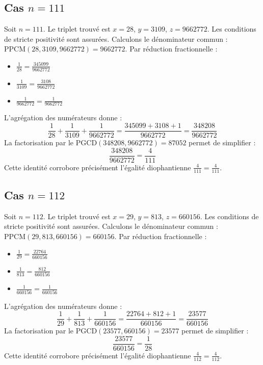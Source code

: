 \documentclass[11pt,a4paper]{article}
\begin{document}
\subsection{Cas $n = 111$}
Soit $n = 111$. Le triplet trouvé est $x = 28$, $y = 3109$, $z = 9662772$.
Les conditions de stricte positivité sont assurées.
Calculons le dénominateur commun : $\text{PPCM}(28, 3109, 9662772) = 9662772$.
Par réduction fractionnelle :
\begin{itemize}
    \item $\frac{1}{28} = \frac{345099}{9662772}$
    \item $\frac{1}{3109} = \frac{3108}{9662772}$
    \item $\frac{1}{9662772} = \frac{1}{9662772}$
\end{itemize}
L'agrégation des numérateurs donne :
$$ \frac{1}{28} + \frac{1}{3109} + \frac{1}{9662772} = \frac{345099 + 3108 + 1}{9662772} = \frac{348208}{9662772} $$
La factorisation par le $\text{PGCD}(348208, 9662772) = 87052$ permet de simplifier :
$$ \frac{348208}{9662772} = \frac{4}{111} $$
Cette identité corrobore précisément l'égalité diophantienne $\frac{4}{111} = \frac{4}{111}$.

\subsection{Cas $n = 112$}
Soit $n = 112$. Le triplet trouvé est $x = 29$, $y = 813$, $z = 660156$.
Les conditions de stricte positivité sont assurées.
Calculons le dénominateur commun : $\text{PPCM}(29, 813, 660156) = 660156$.
Par réduction fractionnelle :
\begin{itemize}
    \item $\frac{1}{29} = \frac{22764}{660156}$
    \item $\frac{1}{813} = \frac{812}{660156}$
    \item $\frac{1}{660156} = \frac{1}{660156}$
\end{itemize}
L'agrégation des numérateurs donne :
$$ \frac{1}{29} + \frac{1}{813} + \frac{1}{660156} = \frac{22764 + 812 + 1}{660156} = \frac{23577}{660156} $$
La factorisation par le $\text{PGCD}(23577, 660156) = 23577$ permet de simplifier :
$$ \frac{23577}{660156} = \frac{1}{28} $$
Cette identité corrobore précisément l'égalité diophantienne $\frac{4}{112} = \frac{4}{112}$.
\end{document}
